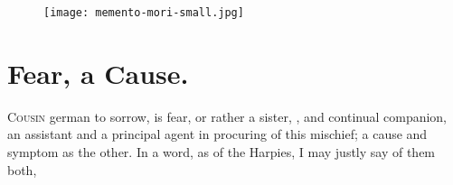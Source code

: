 \cleartoleftpage{}
\begin{figure}[p]
  \begingroup
  \centering
  \texttt{[image: memento-mori-small.jpg]}
  \label{fig:mementomori}
\end{figure}

\clearpage{}
\thispagestyle{titleontop}
\section{Fear, a Cause.}

\lettrine{C}{ousin} german to sorrow, is fear, or rather a sister, , and continual companion, an assistant and a principal agent in
procuring of this mischief; a cause and symptom as the other. In a word, as
\Virgil{} of the Harpies, I may justly say of them both,


